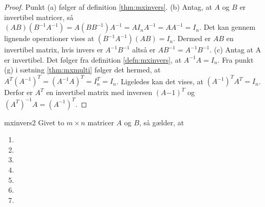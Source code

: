 %
%
\begin{proof}
Punkt (a) følger af definition \ref{thm:mxinvers}. 
(b) Antag, at $A$ og $B$ er invertibel matricer, så $(AB)(B^{-1}A^{-1})=A(BB^{-1})A^{-1}=AI_nA^{-1}=AA^{-1}=I_n$. 
Det kan gennem lignende operationer vises at $(B^{-1}A^{-1})(AB)=I_n$.
Dermed er $AB$ en invertibel matrix, hvis invers er $A^{-1}B^{-1}$ altså er $AB^{-1}=A^{-1}B^{-1}$.
(c) Antag at A er invertibel. 
Det følger fra definition \ref{defn:mxinvers}, at $A^{-1}A=I_n$. 
Fra punkt (g) i sætning \ref{thm:mxmulti} følger det hermed, at $A^T(A^{-1})^T=(A^{-1}A)^T=I_n^T=I_n$. 
Ligeledes kan det vises, at $(A^{-1})^TA^T=I_n$. 
Derfor er $A^T$ en invertibel matrix med inversen $(A{-1})^T$ og $(A^T)^{-1}A=(A^{-1})^T$.
\end{proof}
%
%
\begin{thm}{}{mxinvers2}
Givet to $m \times n$ matricer $A$ og $B$, så gælder, at
\begin{enumerate}[label=(\alph*)]
\item 
\item 
\item 
\item 
\item 
\item 
\item 

\end{enumerate}
\end{thm}
